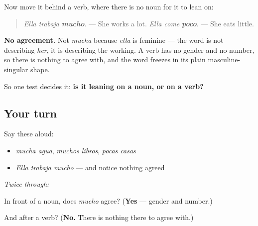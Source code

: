 \begin{grammarlens}[title={Grammar Lens: after a verb, it freezes}]
Now move it behind a verb, where there is no noun for it to lean on:

\begin{quote}
\emph{Ella trabaja} \emph{\textbf{mucho}}. — She works a lot. \emph{Ella come} \emph{\textbf{poco}}. — She eats little.
\end{quote}

\textbf{No agreement.} Not \emph{mucha} because \emph{ella} is feminine — the word is not describing \emph{her}, it is describing the working. A verb has no gender and no number, so there is nothing to agree with, and the word freezes in its plain masculine-singular shape.

So one test decides it: \textbf{is it leaning on a noun, or on a verb?}
\end{grammarlens}

\subsection*{Your turn}
Say these aloud:

\begin{itemize}
\raggedright
  \item \emph{mucha agua}, \emph{muchos libros}, \emph{pocas casas}
  \item \emph{Ella trabaja mucho} — and notice nothing agreed
\end{itemize}

\emph{Twice through:}

\begin{tcolorbox}[breakable,colback=teal!4,colframe=teal!35!black,title={Before you move on}]
In front of a noun, does \emph{mucho} agree? (\textbf{Yes} — gender and number.)

And after a verb? (\textbf{No.} There is nothing there to agree with.)
\end{tcolorbox}
